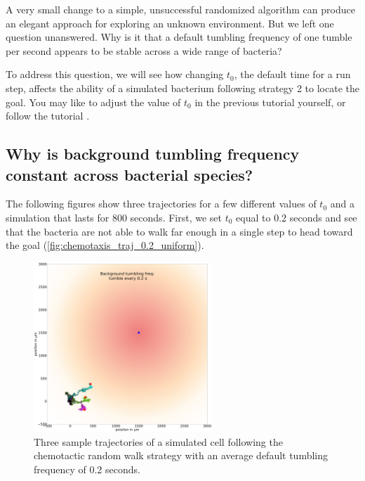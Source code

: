 A very small change to a simple, unsuccessful randomized algorithm can produce an elegant approach for exploring an unknown environment. But we left one question unanswered. Why is it that a default tumbling frequency of one tumble per second appears to be stable across a wide range of bacteria?

To address this question, we will see how changing $t_0$, the default time for a run step, affects the ability of a simulated bacterium following strategy 2 to locate the goal. You may like to adjust the value of $t_0$ in the previous tutorial  yourself, or follow the tutorial .


\FloatBarrier
{}
{}
\subsection{Why is background tumbling frequency constant across bacterial species?}


The following figures show three trajectories for a few different values of $t_0$ and a simulation that lasts for 800 seconds. First, we set $t_0$ equal to 0.2 seconds and see that the bacteria are not able to walk far enough in a single step to head toward the goal (\autoref{fig:chemotaxis_traj_0.2_uniform}).

\begin{figure}[h]
\centering
\mySfFamily
\includegraphics[width = 0.6\textwidth]{../images/chemotaxis_traj_0.2_uniform.png}
\caption{Three sample trajectories of a simulated cell following the chemotactic random walk strategy with an average default tumbling frequency of 0.2 seconds.}
\label{fig:chemotaxis_traj_0.2_uniform}
\end{figure}

